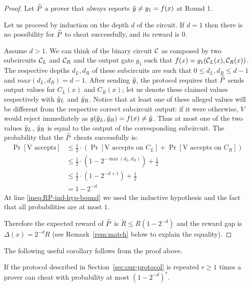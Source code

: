 \begin{proof}
Let $\widetilde{P}$ a prover that always reports $\tilde{y} \neq y_1 = f(x)$ at Round 1. 

Let us proceed by induction on the depth $d$ of the circuit.
If $d = 1$ then there is no possibility for $\widetilde{P}$ to cheat successfully, and its 
reward is $0$. 

Assume $d > 1$. We can think of the binary circuit $\cal C$ as composed by two 
subcircuits ${\cal C}_L$ and ${\cal C}_R$ and the output gate $g_1$ such that
$f(x) = g_1({\cal C}_L(x), {\cal C}_R(x))$. The respective depths $d_L, d_R$ of these 
subcircuits are such that $0 \leq d_L, d_R \leq d-1$ and $max(d_L,d_R)=d-1$. After sending 
$\tilde{y}$, 
the protocol requires that
$\widetilde{P}$ sends output values for $C_L(x)$ and
$C_R(x)$; let us denote these claimed values respectively with $\tilde{y}_L$ 
and  $\tilde{y}_R$. 
Notice that at least one of these alleged values will be different from the 
respective correct subcircuit output: if it were otherwise, $V$ would 
reject immediately as $g(\tilde{y}_L, \tilde{y}_R) = f(x) \neq \tilde{y}$.
Thus at most one of the two values $\tilde{y}_L$, $\tilde{y}_R$ is equal 
to the output of the corresponding subcircuit.
The probability that the $\widetilde{P}$ cheats successfully is:
\begin{align}
\Pr[\mbox{V accepts}] & \leq 
\frac{1}{2}\cdot(\Pr[\mbox{V accepts on } C_L] + \Pr[\mbox{V accepts on } C_R]) 
\label{ineq:RP-formula-vs-circuit}
\\
& \leq \frac{1}{2}\cdot(1-2^{-\max(d_L, d_R)}) + \frac{1}{2} 
\label{ineq:RP-ind-hyp-bound} \\
& \leq \frac{1}{2}\cdot(1-2^{-d+1}) + \frac{1}{2} \\
& = 1 - 2^{-d}
\end{align}
At line \ref{ineq:RP-ind-hyp-bound} we used the inductive hypothesis and the 
fact 
that all probabilities are at most $1$.

Therefore the expected reward of $\widetilde{P}$ is $\tilde{R} \leq R(1-2^{-d})$ and the reward 
gap is $\Delta(x) = 2^{-d}R$ (see Remark~\ref{rem:match} below to explain the equality). 
\end{proof}

The following useful corollary follows from the proof above.
\begin{corollary}
	\label{cor:repetitions}
	If the protocol described in Section~\ref{sec:our-protocol} is repeated $r \geq 1$ times a prover can cheat with probability at most $(1-2^{-d})^r$. 
\end{corollary}

